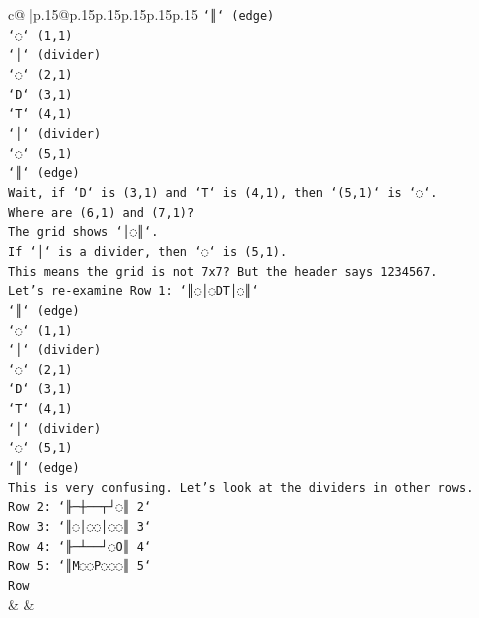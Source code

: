 \documentclass{article}
\begin{document}
{\begin{supertabular}{c@{$\;$}|p{.15\linewidth}@{}p{.15\linewidth}p{.15\linewidth}p{.15\linewidth}p{.15\linewidth}p{.15\linewidth}}
{{{\texttt{`║` (edge)} \\
\texttt{`◌` (1,1)} \\
\texttt{`│` (divider)} \\
\texttt{`◌` (2,1)} \\
\texttt{`D` (3,1)} \\
\texttt{`T` (4,1)} \\
\texttt{`│` (divider)} \\
\texttt{`◌` (5,1)} \\
\texttt{`║` (edge)} \\
\texttt{Wait, if `D` is (3,1) and `T` is (4,1), then `(5,1)` is `◌`.} \\
\texttt{Where are (6,1) and (7,1)?} \\
\texttt{The grid shows `│◌║`.} \\
\texttt{If `│` is a divider, then `◌` is (5,1).} \\
\texttt{This means the grid is not 7x7? But the header says 1234567.} \\
\texttt{Let's re{-}examine Row 1: `║◌│◌DT│◌║`} \\
\texttt{`║` (edge)} \\
\texttt{`◌` (1,1)} \\
\texttt{`│` (divider)} \\
\texttt{`◌` (2,1)} \\
\texttt{`D` (3,1)} \\
\texttt{`T` (4,1)} \\
\texttt{`│` (divider)} \\
\texttt{`◌` (5,1)} \\
\texttt{`║` (edge)} \\
\texttt{This is very confusing. Let's look at the dividers in other rows.} \\
\texttt{Row 2: `╟─┼──┬┘◌║ 2`} \\
\texttt{Row 3: `║◌│◌◌│◌◌║ 3`} \\
\texttt{Row 4: `╟─┴──┘◌O║ 4`} \\
\texttt{Row 5: `║M◌◌P◌◌◌║ 5`} \\
\texttt{Row} \\
            }
        }
    }
    & & \\ \\


\end{supertabular}}
\end{document}
